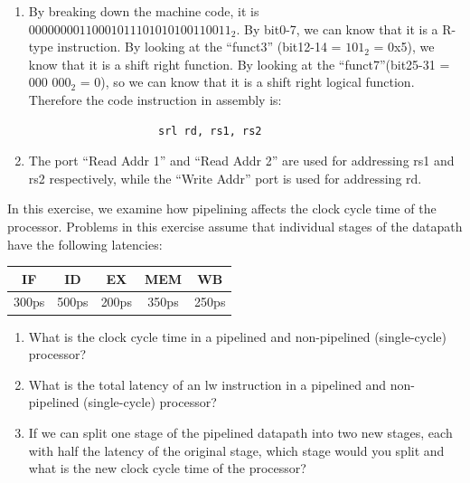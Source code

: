 \documentclass[12pt, a4paper]{article}
\begin{document}
\begin{ans}
    \begin{enumerate}
        \item By breaking down the machine code, it is \texttt{$0000 0000 1100 0101 1101 0101 0011 0011_2$}. By bit0-7, we can know that it is a R-type instruction. By looking at the ``funct3'' (bit12-14 = $101_2$ = 0x5), we know that it is a
                shift right function. By looking at the ``funct7''(bit25-31 = 000 000$_2$ = 0), so we can know that it is a shift right logical function. Therefore the code instruction in assembly is:
                \begin{verbatim}
                    srl rd, rs1, rs2
                \end{verbatim}
        \item The port ``Read Addr 1'' and ``Read Addr 2'' are used for addressing rs1 and rs2 respectively, while the ``Write Addr'' port is used for addressing rd.
    \end{enumerate}
\end{ans}
\pagebreak
\begin{q}{20}
In this exercise, we examine how pipelining affects the clock cycle time of the 
processor. Problems in this exercise assume that individual stages of the datapath 
have the following latencies:
\begin{center}
    \begin{tabular}{|c|c|c|c|c|}
        \hline
        \bf{IF} & \bf{ID} & \bf{EX} & \bf{MEM} & \bf{WB}\\
        \hline
        300ps & 500ps & 200ps & 350ps & 250ps\\
        \hline
    \end{tabular}
\end{center}
\begin{enumerate}
    \item What is the clock cycle time in a pipelined and non-pipelined (single-cycle) processor?
    \item What is the total latency of an lw instruction in a pipelined and non-pipelined
    (single-cycle) processor?
    \item If we can split one stage of the pipelined datapath into two new stages, each with
    half the latency of the original stage, which stage would you split and what is the
    new clock cycle time of the processor?
\end{enumerate}
\end{q}
\end{document}
